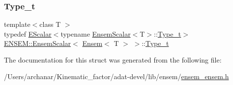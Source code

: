 \subsubsection{\texorpdfstring{Type\_t}{Type\_t}\hspace{0.1cm}{\footnotesize\ttfamily [3/3]}}
{\footnotesize\ttfamily template$<$class T $>$ \\
typedef \mbox{\hyperlink{classENSEM_1_1EScalar}{E\+Scalar}}$<$typename \mbox{\hyperlink{structENSEM_1_1EnsemScalar}{Ensem\+Scalar}}$<$T$>$\+::\mbox{\hyperlink{structENSEM_1_1EnsemScalar_3_01Ensem_3_01T_01_4_01_4_a7452a3e2409e2d8a2ae3ea41eec32972}{Type\+\_\+t}}$>$ \mbox{\hyperlink{structENSEM_1_1EnsemScalar}{E\+N\+S\+E\+M\+::\+Ensem\+Scalar}}$<$ \mbox{\hyperlink{classENSEM_1_1Ensem}{Ensem}}$<$ T $>$ $>$\+::\mbox{\hyperlink{structENSEM_1_1EnsemScalar_3_01Ensem_3_01T_01_4_01_4_a7452a3e2409e2d8a2ae3ea41eec32972}{Type\+\_\+t}}}



The documentation for this struct was generated from the following file\+:\begin{DoxyCompactItemize}
\item 
/\+Users/archanar/\+Kinematic\+\_\+factor/adat-\/devel/lib/ensem/\mbox{\hyperlink{adat-devel_2lib_2ensem_2ensem__ensem_8h}{ensem\+\_\+ensem.\+h}}\end{DoxyCompactItemize}
